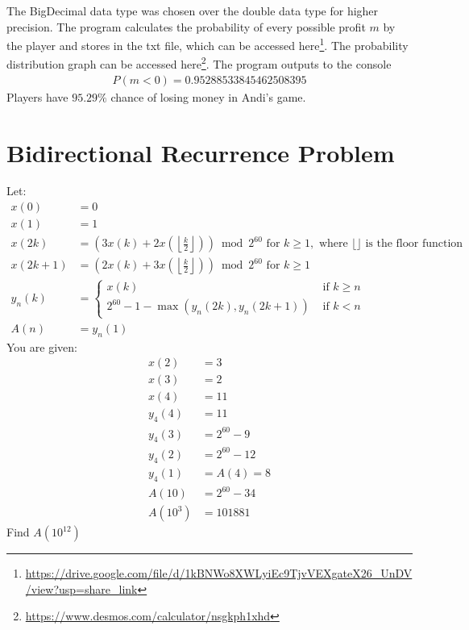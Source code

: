 \documentclass{article}
\begin{document}
The BigDecimal data type was chosen over the double data type for higher precision. The program calculates the probability of every possible profit $m$ by the player and stores in the txt file, which can be accessed here\footnote{\url{https://drive.google.com/file/d/1kBNWo8XWLyiEc9TjvVEXgateX26_UnDV/view?usp=share_link}}. The probability distribution graph can be accessed here\footnote{\url{https://www.desmos.com/calculator/nsgkph1xhd}}. The program outputs to the console
\begin{align*}
    P(m < 0) = 0.95288533845462508395
\end{align*}
Players have $95.29\%$ chance of losing money in Andi's game. 




\pagebreak
\section{Bidirectional Recurrence Problem}
\begin{custom-big}[Question 2]
Let:
$$
\begin{array}{ll}
x(0) & =0 \\
x(1) & =1 \\
x(2 k) & =\left(3 x(k)+2 x\left(\left\lfloor\frac{k}{2}\right\rfloor\right)\right) \bmod 2^{60} \text { for } k \geq 1, \text { where }\lfloor\rfloor \text { is the floor function } \\
x(2 k+1) & =\left(2 x(k)+3 x\left(\left\lfloor\frac{k}{2}\right\rfloor\right)\right) \bmod 2^{60} \text { for } k \geq 1 \\
y_n(k) & = \begin{cases}x(k) & \text { if } k \geq n \\
2^{60}-1-\max \left(y_n(2 k), y_n(2 k+1)\right) & \text { if } k<n\end{cases} \\
A(n) & =y_n(1)
\end{array}
$$
You are given:
$$
\begin{array}{ll}
x(2) & =3 \\
x(3) & =2 \\
x(4) & =11 \\
y_4(4) & =11 \\
y_4(3) & =2^{60}-9 \\
y_4(2) & =2^{60}-12 \\
y_4(1) & =A(4)=8 \\
A(10) & =2^{60}-34 \\
A\left(10^3\right) & =101881
\end{array}
$$
Find $A\left(10^{12}\right)$
\end{custom-big}
\end{document}

